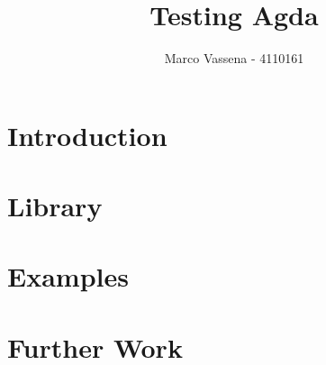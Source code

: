 \documentclass[10pt,a4paper]{report}
\author{Marco Vassena - 4110161}
\title{Testing Agda}
\begin{document}
\maketitle

\section*{Introduction}

\section*{Library}

\section*{Examples}

\section*{Further Work}
\end{document}
